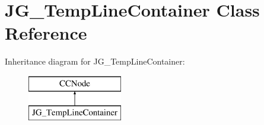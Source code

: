\hypertarget{class_j_g___temp_line_container}{\section{J\-G\-\_\-\-Temp\-Line\-Container Class Reference}
\label{class_j_g___temp_line_container}
}
Inheritance diagram for J\-G\-\_\-\-Temp\-Line\-Container\-:\begin{figure}[H]
\begin{center}
\leavevmode
\includegraphics[height=2.000000cm]{class_j_g___temp_line_container}
\end{center}
\end{figure}
